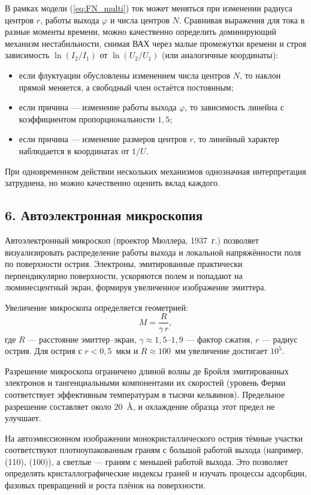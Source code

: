\documentclass[12pt, a4paper]{article}
\begin{document}
В рамках модели (\ref{eq:FN_multi}) ток может меняться при изменении радиуса центров $r$, работы выхода $\varphi$ и числа центров $N$. Сравнивая выражения для тока в разные моменты времени, можно качественно определить доминирующий механизм нестабильности, снимая ВАХ через малые промежутки времени и строя зависимость $\ln(I_{2}/I_{1})$ от $\ln(U_{2}/U_{1})$ (или аналогичные координаты):
\begin{itemize}
    \item если флуктуации обусловлены изменением числа центров $N$, то наклон прямой меняется, а свободный член остаётся постоянным;
    \item если причина --- изменение работы выхода $\varphi$, то зависимость линейна с коэффициентом пропорциональности $1{,}5$;
    \item если причина --- изменение размеров центров $r$, то линейный характер наблюдается в координатах от $1/U$.
\end{itemize}
При одновременном действии нескольких механизмов однозначная интерпретация затруднена, но можно качественно оценить вклад каждого.

\subsection*{6. Автоэлектронная микроскопия}

Автоэлектронный микроскоп (проектор Мюллера, 1937~г.) позволяет визуализировать распределение работы выхода и локальной напряжённости поля по поверхности острия. Электроны, эмитированные практически перпендикулярно поверхности, ускоряются полем и попадают на люминесцентный экран, формируя увеличенное изображение эмиттера.

Увеличение микроскопа определяется геометрией:
\begin{equation}
    M = \frac{R}{\gamma\,r},
    \label{eq:magnification}
\end{equation}
где $R$ --- расстояние эмиттер--экран, $\gamma \approx 1{,}5$--$1{,}9$ --- фактор сжатия, $r$ --- радиус острия. Для острия с $r < 0{,}5$~мкм и $R \approx 100$~мм увеличение достигает $10^{5}$.

Разрешение микроскопа ограничено длиной волны де Бройля эмитированных электронов и тангенциальными компонентами их скоростей (уровень Ферми соответствует эффективным температурам в тысячи кельвинов). Предельное разрешение составляет около $20$~\AA, и охлаждение образца этот предел не улучшает.

На автоэмиссионном изображении монокристаллического острия тёмные участки соответствуют плотноупакованным граням с большой работой выхода (например, (110), (100)), а светлые --- граням с меньшей работой выхода. Это позволяет определять кристаллографические индексы граней и изучать процессы адсорбции, фазовых превращений и роста плёнок на поверхности.
\end{document}
